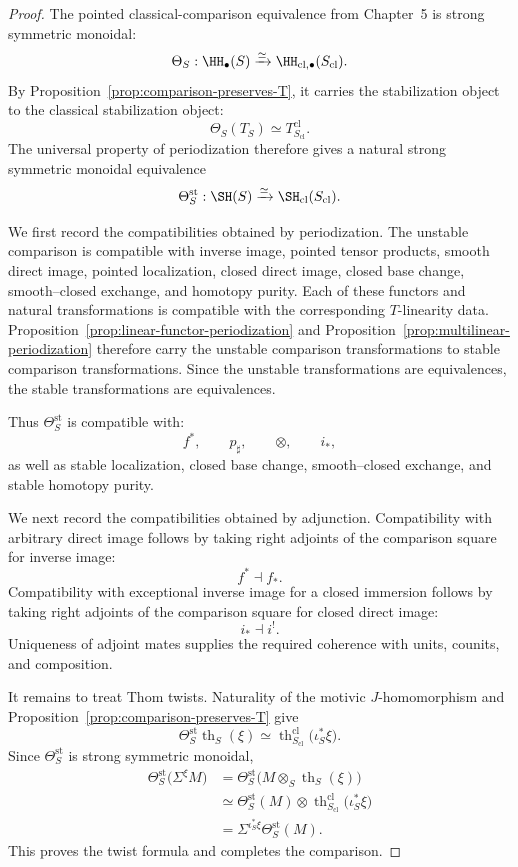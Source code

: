 \begin{proof}
The pointed classical-comparison equivalence from Chapter~5 is strong
symmetric monoidal:
\[
    \Theta_S:
    \HH_\bullet(S)
    \xrightarrow{\simeq}
    \HH_{\mathrm{cl},\bullet}(S_{\mathrm{cl}}).
\]
By Proposition~\ref{prop:comparison-preserves-T}, it carries the
stabilization object to the classical stabilization object:
\[
    \Theta_S(T_S)
    \simeq
    T^{\mathrm{cl}}_{S_{\mathrm{cl}}}.
\]
The universal property of periodization therefore gives a natural strong
symmetric monoidal equivalence
\[
    \Theta_S^{\mathrm{st}}:
    \SH(S)
    \xrightarrow{\simeq}
    \SH_{\mathrm{cl}}(S_{\mathrm{cl}}).
\]

We first record the compatibilities obtained by periodization.  The unstable
comparison is compatible with inverse image, pointed tensor products, smooth
direct image, pointed localization, closed direct image, closed base change,
smooth--closed exchange, and homotopy purity.  Each of these functors and
natural transformations is compatible with the corresponding \(T\)-linearity
data.  Proposition~\ref{prop:linear-functor-periodization} and
Proposition~\ref{prop:multilinear-periodization} therefore carry the
unstable comparison transformations to stable comparison transformations.
Since the unstable transformations are equivalences, the stable
transformations are equivalences.

Thus \(\Theta_S^{\mathrm{st}}\) is compatible with:
\[
    f^*,
    \qquad
    p_\sharp,
    \qquad
    \otimes,
    \qquad
    i_*,
\]
as well as stable localization, closed base change, smooth--closed exchange,
and stable homotopy purity.

We next record the compatibilities obtained by adjunction.  Compatibility
with arbitrary direct image follows by taking right adjoints of the
comparison square for inverse image:
\[
    f^*\dashv f_*.
\]
Compatibility with exceptional inverse image for a closed immersion follows
by taking right adjoints of the comparison square for closed direct image:
\[
    i_*\dashv i^!.
\]
Uniqueness of adjoint mates supplies the required coherence with units,
counits, and composition.

It remains to treat Thom twists.  Naturality of the motivic
\(J\)-homomorphism and
Proposition~\ref{prop:comparison-preserves-T} give
\[
    \Theta_S^{\mathrm{st}}
    \operatorname{th}_S(\xi)
    \simeq
    \operatorname{th}^{\mathrm{cl}}_{S_{\mathrm{cl}}}
    \bigl(
      \iota_S^*\xi
    \bigr).
\]
Since \(\Theta_S^{\mathrm{st}}\) is strong symmetric monoidal,
\[
\begin{aligned}
    \Theta_S^{\mathrm{st}}
    \bigl(
      \Sigma^\xi M
    \bigr)
    &=
    \Theta_S^{\mathrm{st}}
    \bigl(
      M\otimes_S\operatorname{th}_S(\xi)
    \bigr) \\
    &\simeq
    \Theta_S^{\mathrm{st}}(M)
    \otimes
    \operatorname{th}^{\mathrm{cl}}_{S_{\mathrm{cl}}}
    \bigl(
      \iota_S^*\xi
    \bigr) \\
    &=
    \Sigma^{\iota_S^*\xi}
    \Theta_S^{\mathrm{st}}(M).
\end{aligned}
\]
This proves the twist formula and completes the comparison.
\end{proof}


